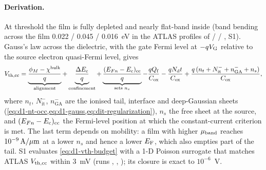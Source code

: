 \paragraph{Derivation.}
At threshold the film is fully depleted and nearly flat-band inside (band bending across the film 0.022 / 0.045 /
0.016~eV in the ATLAS profiles of  /  / , S1). Gauss's law across the dielectric, with
the gate Fermi level at $-qV_{\mathrm{G}}$ relative to the source electron quasi-Fermi level, gives
\begin{equation}
  V_{\mathrm{th,cc}} = \underbrace{\frac{\phi_M-\chi^{\mathrm{bulk}}}{q}}_{\text{alignment}}
         + \underbrace{\frac{\Delta E_{\mathrm{c}}}{q}}_{\text{confinement}}
         + \underbrace{\frac{(E_{Fn}-E_{\mathrm{c}})_{\mathrm{cc}}}{q}}_{\text{sets }n_s}
         - \frac{qQ_{\mathrm{f}}}{C_{\mathrm{ox}}}
         - \frac{qN_{\mathrm{d}} t}{C_{\mathrm{ox}}}
         + \frac{q\,(n_t + N_{\mathrm{it}}^{-} + n_{\mathrm{GA}}^{-} + n_s)}{C_{\mathrm{ox}}},
  \label{eq:d1-vth-budget}
\end{equation}
where $n_t$, $N_{\mathrm{it}}^{-}$, $n_{\mathrm{GA}}^{-}$ are the ionised tail, interface and deep-Gaussian sheets
(\cref{eq:d1-nt-occ,eq:d1-gauss,eq:dit-regularization}), $n_s$ the free sheet at the source, and
$(E_{Fn}-E_{\mathrm{c}})_{\mathrm{cc}}$ the Fermi-level position at which the constant-current criterion is met. The last term
depends on mobility: a film with higher $\mu_{\mathrm{band}}$ reaches $10^{-9}\,\mathrm{A}/\mu\mathrm{m}$ at a lower $n_s$ and hence a lower $E_{\mathrm{F}}$, which
also empties part of the tail. S1 evaluates \cref{eq:d1-vth-budget} with a 1-D Poisson surrogate that matches ATLAS
$V_{\mathrm{th,cc}}$ within 3~mV (runs , , ); its closure is exact to $10^{-6}$~V.

